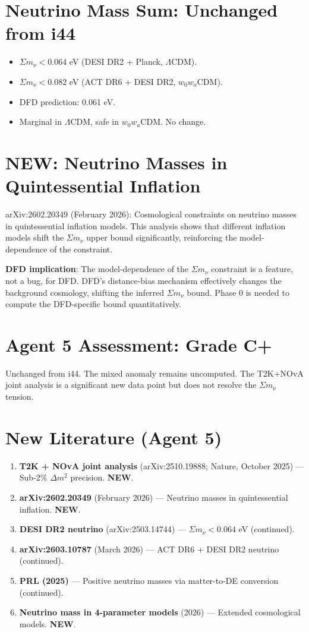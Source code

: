 \documentclass[11pt,a4paper]{article}
\newcommand{\NEW}{\textcolor{dfdblue}{\textbf{NEW}}}
\begin{document}
\section{Neutrino Mass Sum: Unchanged from i44}

\begin{itemize}
\item $\Sigma m_\nu < 0.064$ eV (DESI DR2 + Planck, $\Lambda$CDM).
\item $\Sigma m_\nu < 0.082$ eV (ACT DR6 + DESI DR2, $w_0 w_a$CDM).
\item DFD prediction: 0.061 eV.
\item Marginal in $\Lambda$CDM, safe in $w_0 w_a$CDM. No change.
\end{itemize}

\section{\NEW: Neutrino Masses in Quintessential Inflation}

arXiv:2602.20349 (February 2026): Cosmological constraints on neutrino masses in quintessential inflation models. This analysis shows that different inflation models shift the $\Sigma m_\nu$ upper bound significantly, reinforcing the model-dependence of the constraint.

\textbf{DFD implication}: The model-dependence of the $\Sigma m_\nu$ constraint is a feature, not a bug, for DFD. DFD's distance-bias mechanism effectively changes the background cosmology, shifting the inferred $\Sigma m_\nu$ bound. Phase 0 is needed to compute the DFD-specific bound quantitatively.

\section{Agent 5 Assessment: Grade C+}

Unchanged from i44. The mixed anomaly remains uncomputed. The T2K+NOvA joint analysis is a significant new data point but does not resolve the $\Sigma m_\nu$ tension.

\section{New Literature (Agent 5)}

\begin{enumerate}
\item \textbf{T2K + NOvA joint analysis} (arXiv:2510.19888; Nature, October 2025) --- Sub-2\% $\Delta m^2$ precision. \NEW.
\item \textbf{arXiv:2602.20349} (February 2026) --- Neutrino masses in quintessential inflation. \NEW.
\item \textbf{DESI DR2 neutrino} (arXiv:2503.14744) --- $\Sigma m_\nu < 0.064$ eV (continued).
\item \textbf{arXiv:2603.10787} (March 2026) --- ACT DR6 + DESI DR2 neutrino (continued).
\item \textbf{PRL (2025)} --- Positive neutrino masses via matter-to-DE conversion (continued).
\item \textbf{Neutrino mass in 4-parameter models} (2026) --- Extended cosmological models. \NEW.
\end{enumerate}
\end{document}

